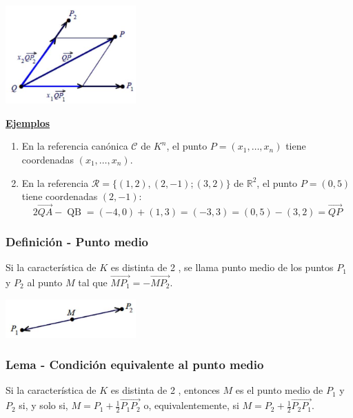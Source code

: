 \documentclass[12pt, a4paper, ones, notitlepage, openany,titlepage]{article}
\newcommand{\ejemplos}{\noindent\underline{\textbf{Ejemplos}}}
\begin{document}
\begin{center}
\includegraphics[max width=5cm]{2023_03_01_7659aec5e35f9a9b2d3cg-12(2)}
\end{center}

\ejemplos
\begin{enumerate}[label=(\arabic*)]
\item En la referencia canónica $\mathcal{C}$ de $K^{n}$, el punto $P=\left(x_{1}, \ldots, x_{n}\right)$ tiene coordenadas $\left(x_{1}, \ldots, x_{n}\right)$.

\item En la referencia $\mathcal{R}=\{(1,2),(2,-1) ;(3,2)\}$ de $\mathbb{R}^{2}$, el punto $P=(0,5)$ tiene coordenadas $(2,-1)$:
$$
2 \overrightarrow{QA} - \operatorname{QB} = (-4,0) + (1,3) = (-3,3) = (0,5) - (3,2) = \overrightarrow{QP}
$$
\end{enumerate}

\subsubsection{Definición - Punto medio}
Si la característica de $K$ es distinta de 2 , se llama punto medio de los puntos $P_{1}$ y $P_{2}$ al punto $M$ tal que $\overrightarrow{M P_{1}}=-\overrightarrow{M P_{2}}$.

\begin{center}
\includegraphics[max width=5cm]{2023_03_01_7659aec5e35f9a9b2d3cg-12}
\end{center}

\subsubsection{Lema - Condición equivalente al punto medio}
Si la característica de $K$ es distinta de 2 , entonces $M$ es el punto medio de $P_{1}$ y $P_{2}$ si, y solo si, $M=P_{1}+\frac{1}{2} \overrightarrow{P_{1} P_{2}}$ o, equivalentemente, si $M=P_{2}+\frac{1}{2} \overrightarrow{P_{2} P_{1}}$.
\end{document}
